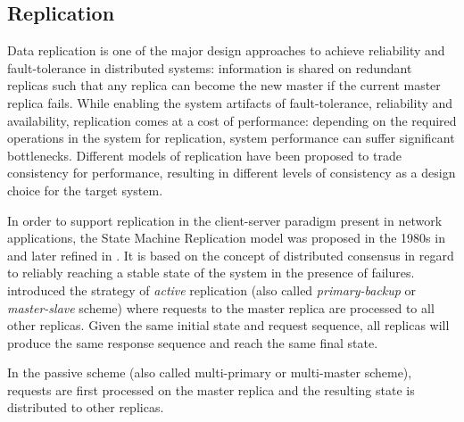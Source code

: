 \subsection{Replication}
\label{sec:replication}


Data replication is one of the major design approaches to achieve reliability and fault-tolerance in distributed systems: information is shared on redundant replicas such that any replica can become the new master if the current master replica fails. While enabling the system artifacts of fault-tolerance, reliability and availability, replication comes at a cost of performance: depending on the required operations in the system for replication, system performance can suffer significant bottlenecks. Different models of replication have been proposed to trade consistency for performance, resulting in different levels of consistency as a design choice for the target system.

In order to support replication in the client-server paradigm present in network applications, the State Machine Replication model was proposed in the 1980s in \cite{Lamport:1984} and later refined in \cite{Schneider:1990}. It is based on the concept of distributed consensus in regard to reliably reaching a stable state of the system in the presence of failures. \cite{Lamport:1984} introduced the strategy of \textit{active} replication (also called \textit{primary-backup} or \textit{master-slave} scheme) where requests to the master replica are processed to all other replicas. Given the same initial state and request sequence, all replicas will produce the same response sequence and reach the same final state. 

In the passive scheme (also called multi-primary or multi-master scheme), requests are first processed on the master replica and the resulting state is distributed to other replicas.
